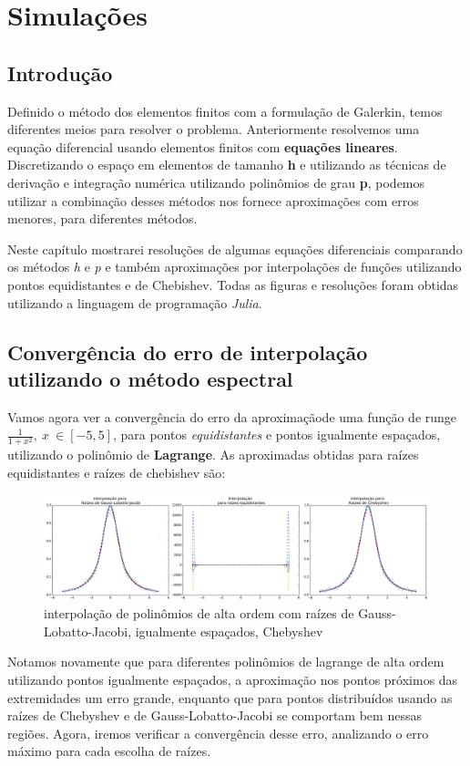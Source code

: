 \chapter{Simulações}   
\label{cap:III}
\section{Introdução}
 Definido o método dos elementos finitos com a formulação de Galerkin, temos diferentes meios para resolver o problema. Anteriormente resolvemos uma equação diferencial usando elementos finitos com \textbf{equações lineares}. Discretizando o espaço em elementos de tamanho \textbf{h} e utilizando as técnicas de derivação e integração numérica utilizando polinômios de grau \textbf{p}, podemos utilizar a combinação desses métodos nos fornece aproximações com erros menores, para diferentes métodos.
 
 Neste capítulo mostrarei resoluções de algumas equações diferenciais comparando os métodos \emph{h} e \emph{p}  e também aproximações por interpolações de funções utilizando pontos equidistantes e de Chebishev. Todas as figuras e resoluções foram obtidas utilizando a linguagem de programação \emph{Julia}.

\section{Convergência do erro de interpolação utilizando o método espectral}
	Vamos agora ver a convergência do erro da aproximaçãode uma função de runge $\frac{1}{1+x^2},\ x\ \in [-5,5]$, para pontos \emph{equidistantes} e pontos igualmente espaçados, utilizando o polinômio de \textbf{Lagrange}.
	As aproximadas obtidas para raízes equidistantes e raízes de chebishev são:\\	
\begin{figure}[!ht]
  \includegraphics[width=1.25\textwidth,center]{figuras/interpolacao_todas.png}
  \caption{interpolação de polinômios de alta ordem com raízes de Gauss-Lobatto-Jacobi, igualmente espaçados, Chebyshev}
\end{figure}
Notamos novamente que para diferentes  polinômios de lagrange de alta ordem utilizando pontos igualmente espaçados, a aproximação nos pontos próximos das extremidades um erro  grande, enquanto que para pontos distribuídos usando as raízes de Chebyshev e de Gauss-Lobatto-Jacobi se comportam bem nessas regiões. Agora, iremos verificar a convergência desse erro, analizando o erro máximo para cada escolha de raízes.

